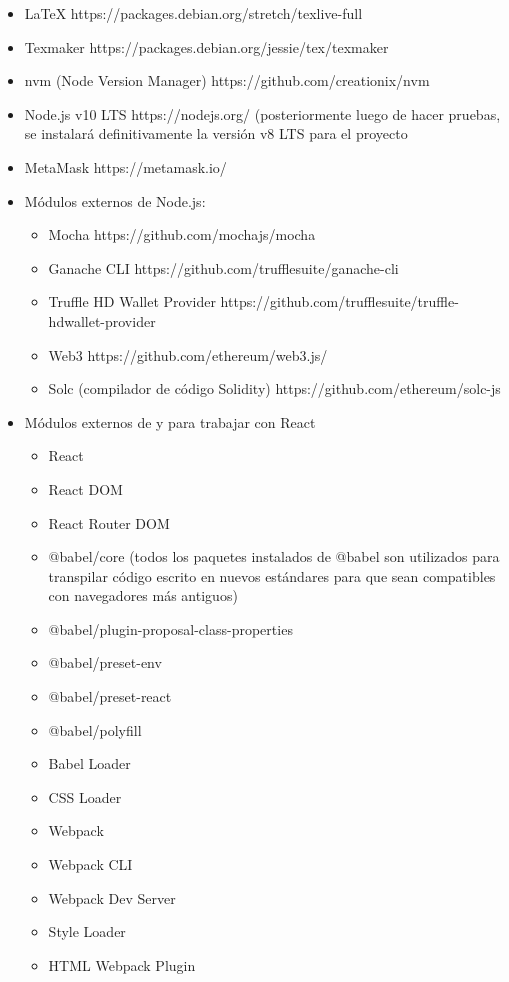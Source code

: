 \begin{itemize}
\item LaTeX https://packages.debian.org/stretch/texlive-full
\item Texmaker https://packages.debian.org/jessie/tex/texmaker
\item nvm (Node Version Manager) https://github.com/creationix/nvm
\item Node.js v10 LTS https://nodejs.org/ (posteriormente luego de hacer pruebas, se instalará definitivamente la versión v8 LTS para el proyecto
\item MetaMask https://metamask.io/
\item Módulos externos de Node.js:
	\begin{itemize}
		\item Mocha https://github.com/mochajs/mocha
		\item Ganache CLI https://github.com/trufflesuite/ganache-cli
		\item Truffle HD Wallet Provider https://github.com/trufflesuite/truffle-hdwallet-provider
		\item Web3 https://github.com/ethereum/web3.js/
		\item Solc (compilador de código Solidity) https://github.com/ethereum/solc-js
	\end{itemize}
\item Módulos externos de y para trabajar con React
	\begin{itemize}
		\item React
		\item React DOM
		\item React Router DOM
		\item @babel/core (todos los paquetes instalados de @babel son utilizados para transpilar código escrito en nuevos estándares para que sean compatibles con navegadores más antiguos)
		\item @babel/plugin-proposal-class-properties
		\item @babel/preset-env
		\item @babel/preset-react
		\item @babel/polyfill
		\item Babel Loader
		\item CSS Loader
		\item Webpack
		\item Webpack CLI
		\item Webpack Dev Server
		\item Style Loader
		\item HTML Webpack Plugin
	\end{itemize} 
\end{itemize}

